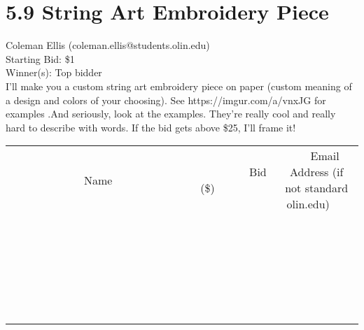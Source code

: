 \documentclass[11pt]{article}
\begin{document}
					\section*{5.9 String Art Embroidery Piece}
					Coleman Ellis (coleman.ellis@students.olin.edu) \\
					Starting Bid: \$1 \\
					Winner(s): Top bidder \\
					I'll make you a custom string art embroidery piece on paper (custom meaning of a design and colors of your choosing). See https://imgur.com/a/vnxJG for examples .And seriously, look at the examples. They're really cool and really hard to describe with words. If the bid gets above \$25, I'll frame it! \\
					[6ex]
					\begin{tabular}{c c c}
						~~~~~~~~~~~~~Name~~~~~~~~~~~~~ & ~~~~~~~~~Bid (\$)~~~~~~~~~ & ~~~Email Address (if not standard olin.edu)~~~ \\
				
 & & \\
\hline
 & & \\
\hline
 & & \\
\hline
 & & \\
\hline
 & & \\
\hline
 & & \\
\hline
 & & \\
\hline
 & & \\
\hline
 & & \\
\hline
 & & \\
\hline
 & & \\
\hline
 & & \\
\hline
 & & \\
\hline
 & & \\
\hline
 & & \\
\hline
 & & \\
\hline
 & & \\
\hline
 & & \\
\hline
 & & \\
\hline
 & & \\
\hline
 & & \\
\hline
 & & \\
\hline
 & & \\
\hline
 & & \\
\hline
 & & \\
\hline
 & & \\
\hline
					\end{tabular}
					\clearpage
				
\end{document}
